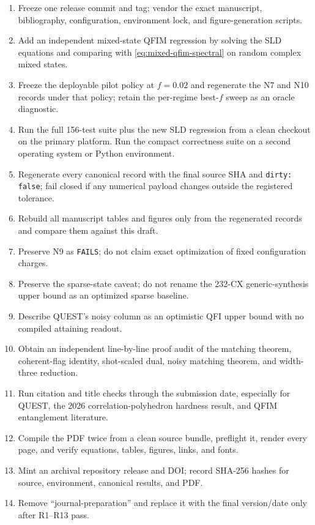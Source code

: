 \documentclass[11pt]{article}
\theoremstyle{definition}
\theoremstyle{remark}
\begin{document}
\begin{enumerate}[label=\textbf{R\arabic*.}]
  \item Freeze one release commit and tag; vendor the exact manuscript, bibliography, configuration, environment lock, and figure-generation scripts.
  \item Add an independent mixed-state QFIM regression by solving the SLD equations and comparing with \cref{eq:mixed-qfim-spectral} on random complex mixed states.
  \item Freeze the deployable pilot policy at $f=0.02$ and regenerate the N7 and N10 records under that policy; retain the per-regime best-$f$ sweep as an oracle diagnostic.
  \item Run the full 156-test suite plus the new SLD regression from a clean checkout on the primary platform. Run the compact correctness suite on a second operating system or Python environment.
  \item Regenerate every canonical record with the final source SHA and \texttt{dirty: false}; fail closed if any numerical payload changes outside the registered tolerance.
  \item Rebuild all manuscript tables and figures only from the regenerated records and compare them against this draft.
  \item Preserve N9 as \texttt{FAILS}; do not claim exact optimization of fixed configuration charges.
  \item Preserve the sparse-state caveat; do not rename the 232-CX generic-synthesis upper bound as an optimized sparse baseline.
  \item Describe QUEST's noisy column as an optimistic QFI upper bound with no compiled attaining readout.
  \item Obtain an independent line-by-line proof audit of the matching theorem, coherent-flag identity, shot-scaled dual, noisy matching theorem, and width-three reduction.
  \item Run citation and title checks through the submission date, especially for QUEST, the 2026 correlation-polyhedron hardness result, and QFIM entanglement literature.
  \item Compile the PDF twice from a clean source bundle, preflight it, render every page, and verify equations, tables, figures, links, and fonts.
  \item Mint an archival repository release and DOI; record SHA-256 hashes for source, environment, canonical results, and PDF.
  \item Remove ``journal-preparation'' and replace it with the final version/date only after R1--R13 pass.
\end{enumerate}
\end{document}
